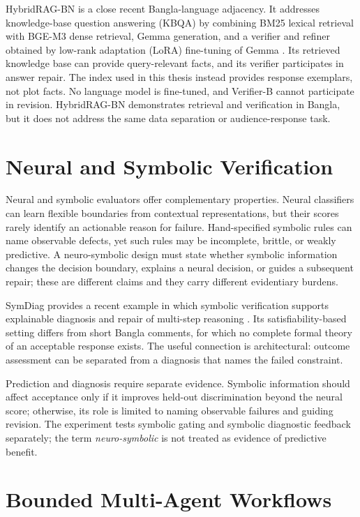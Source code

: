 HybridRAG-BN is a close recent Bangla-language adjacency. It addresses knowledge-base question answering (KBQA) by combining BM25 lexical retrieval with BGE-M3 dense retrieval, Gemma generation, and a verifier and refiner obtained by low-rank adaptation (LoRA) fine-tuning of Gemma \cite{b19}. Its retrieved knowledge base can provide query-relevant facts, and its verifier participates in answer repair. The index used in this thesis instead provides response exemplars, not plot facts. No language model is fine-tuned, and Verifier-B cannot participate in revision. HybridRAG-BN demonstrates retrieval and verification in Bangla, but it does not address the same data separation or audience-response task.

\section{Neural and Symbolic Verification}
\label{sec:neural-symbolic-validation}

Neural and symbolic evaluators offer complementary properties. Neural classifiers can learn flexible boundaries from contextual representations, but their scores rarely identify an actionable reason for failure. Hand-specified symbolic rules can name observable defects, yet such rules may be incomplete, brittle, or weakly predictive. A neuro-symbolic design must state whether symbolic information changes the decision boundary, explains a neural decision, or guides a subsequent repair; these are different claims and they carry different evidentiary burdens.

SymDiag provides a recent example in which symbolic verification supports explainable diagnosis and repair of multi-step reasoning \cite{b20}. Its satisfiability-based setting differs from short Bangla comments, for which no complete formal theory of an acceptable response exists. The useful connection is architectural: outcome assessment can be separated from a diagnosis that names the failed constraint.

Prediction and diagnosis require separate evidence. Symbolic information should affect acceptance only if it improves held-out discrimination beyond the neural score; otherwise, its role is limited to naming observable failures and guiding revision. The experiment tests symbolic gating and symbolic diagnostic feedback separately; the term \emph{neuro-symbolic} is not treated as evidence of predictive benefit.

\section{Bounded Multi-Agent Workflows}
\label{sec:multi-agent-workflows}


